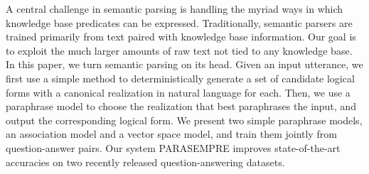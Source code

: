 A central challenge in semantic parsing is handling the myriad ways in which knowledge base predicates can be expressed. Traditionally, semantic parsers are trained primarily from text paired with knowledge base information. Our goal is to exploit the much larger amounts of raw text not tied to any knowledge base. In this paper, we turn semantic parsing on its head. Given an input utterance, we first use a simple method to deterministically generate a set of candidate logical forms with a canonical realization in natural language for each. Then, we use a paraphrase model to choose the realization that best paraphrases the input, and output the corresponding logical form. We present two simple paraphrase models, an association model and a vector space model, and train them jointly from question-answer pairs. Our system PARASEMPRE improves state-of-the-art accuracies on two recently released question-answering datasets.
